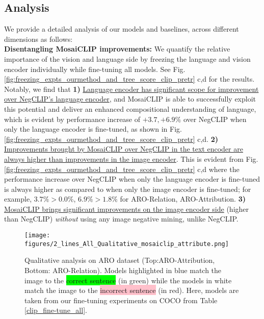 \documentclass[11pt]{article}
\newcommand{\methodcomp}{MosaiCLIP}
\newcommand{\negclip}{NegCLIP}
\begin{document}
\subsection{Analysis}
\label{sec_analysis}
We provide a detailed analysis of our models and baselines, across different dimensions as follows:\\
\newline
\noindent\textbf{Disentangling \methodcomp{} improvements:}
We quantify the relative importance of the vision and language side by freezing the language and vision encoder individually while fine-tuning all models. See Fig. \ref{fig:freezing_expts_ourmethod_and_tree_score_clip_pretr} c,d for the results. 
Notably, we find that \textbf{1)} \uline{Language encoder has significant scope for improvement over \negclip{}'s language encoder}, and \methodcomp{} is able to successfully exploit this potential and deliver an enhanced compositional understanding of language, which is evident by performance increase of $+3.7, +6.9\%$ over \negclip{} when only the language encoder is fine-tuned, as shown in Fig. \ref{fig:freezing_expts_ourmethod_and_tree_score_clip_pretr} c,d.
\textbf{2)} \uline{Improvements brought by \methodcomp{} over \negclip{} in the text encoder are always higher than improvements in the image encoder}. This is evident from Fig. \ref{fig:freezing_expts_ourmethod_and_tree_score_clip_pretr} c,d where the performance increase over \negclip{} when only the language encoder is fine-tuned is always higher as compared to when only the image encoder is fine-tuned; for example, $3.7\% > 0.0\%$, $6.9\% > 1.8\%$ for ARO-Relation, ARO-Attribution.
\textbf{3)} \uline{\methodcomp{} brings significant improvements on the image encoder side} (higher than \negclip{}) \textit{without} using any image negative mining, unlike \negclip{}.
\begin{figure*}[h!]
    \centering
    {\texttt{[image: figures/2\_lines\_All\_Qualitative\_mosaiclip\_attribute.png]}}
    \caption{Qualitative analysis on ARO dataset (Top:ARO-Attribution, Bottom: ARO-Relation). Models highlighted in blue match the image to the \colorbox{lime}{correct sentence} (in green) while the models in white match the image to the \colorbox{pink}{incorrect sentence} (in red). Here, models are taken from our fine-tuning experiments on COCO from Table \ref{clip_fine-tune_all}.}
    \label{fig:quali_aro}
    \vspace{-1em}
    
\end{figure*}
\end{document}
